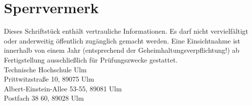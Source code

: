 
\chapter*{Sperrvermerk}
\thispagestyle{sperrvermerk}

\begin{spacing}{1.5}
	Dieses Schriftstück enthält vertrauliche Informationen. Es darf nicht vervielfältigt oder anderweitig
	öffentlich zugänglich gemacht werden. Eine Einsichtnahme ist innerhalb von einem Jahr 
	(entsprechend der Geheimhaltungsverpflichtung!) ab Fertigstellung ausschließlich für Prüfungszwecke 
	gestattet.
	\vspace{10cm}\\
	Technische Hochschule Ulm
	\\
	Prittwitzstraße 10, 89075 Ulm
	\\
	Albert-Einstein-Allee 53-55, 89081 Ulm
	\\
	Postfach 38 60, 89028 Ulm
\end{spacing}